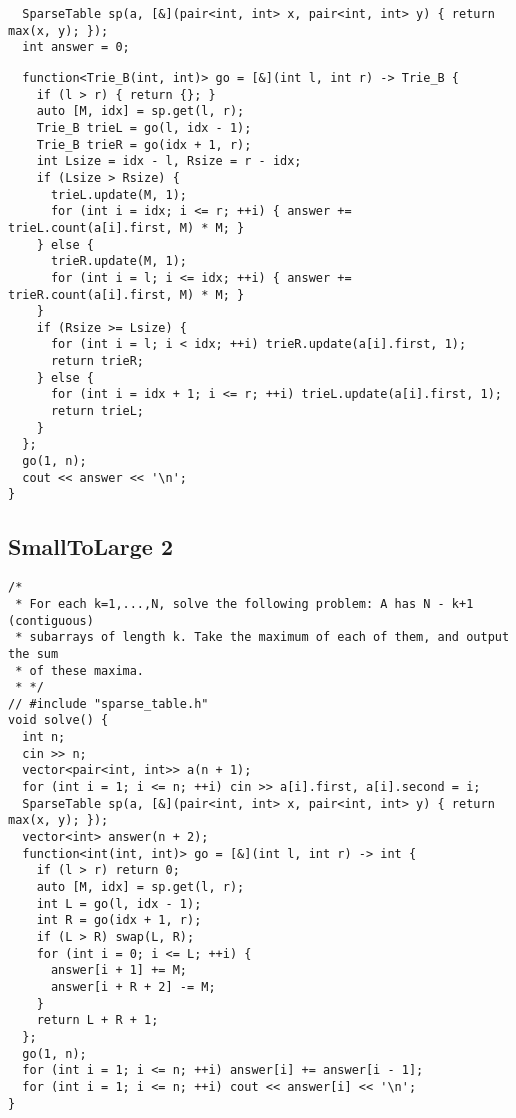 \documentclass[twoside]{article}
\begin{document}
\begin{multicols*}{2}
\begin{verbatim}
  SparseTable sp(a, [&](pair<int, int> x, pair<int, int> y) { return max(x, y); });
  int answer = 0;
\end{verbatim}
\vspace{-12pt}
\begin{verbatim}
  function<Trie_B(int, int)> go = [&](int l, int r) -> Trie_B {
    if (l > r) { return {}; }
    auto [M, idx] = sp.get(l, r);
    Trie_B trieL = go(l, idx - 1);
    Trie_B trieR = go(idx + 1, r);
    int Lsize = idx - l, Rsize = r - idx;
    if (Lsize > Rsize) {
      trieL.update(M, 1);
      for (int i = idx; i <= r; ++i) { answer += trieL.count(a[i].first, M) * M; }
    } else {
      trieR.update(M, 1);
      for (int i = l; i <= idx; ++i) { answer += trieR.count(a[i].first, M) * M; }
    }
    if (Rsize >= Lsize) {
      for (int i = l; i < idx; ++i) trieR.update(a[i].first, 1);
      return trieR;
    } else {
      for (int i = idx + 1; i <= r; ++i) trieL.update(a[i].first, 1);
      return trieL;
    }
  };
  go(1, n);
  cout << answer << '\n';
}
\end{verbatim}

{
\subsection*{SmallToLarge 2}
}
\begin{verbatim}
/*
 * For each k=1,...,N, solve the following problem: A has N - k+1 (contiguous)
 * subarrays of length k. Take the maximum of each of them, and output the sum
 * of these maxima.
 * */
// #include "sparse_table.h"
void solve() {
  int n;
  cin >> n;
  vector<pair<int, int>> a(n + 1);
  for (int i = 1; i <= n; ++i) cin >> a[i].first, a[i].second = i;
  SparseTable sp(a, [&](pair<int, int> x, pair<int, int> y) { return max(x, y); });
  vector<int> answer(n + 2);
  function<int(int, int)> go = [&](int l, int r) -> int {
    if (l > r) return 0;
    auto [M, idx] = sp.get(l, r);
    int L = go(l, idx - 1);
    int R = go(idx + 1, r);
    if (L > R) swap(L, R);
    for (int i = 0; i <= L; ++i) {
      answer[i + 1] += M;
      answer[i + R + 2] -= M;
    }
    return L + R + 1;
  };
  go(1, n);
  for (int i = 1; i <= n; ++i) answer[i] += answer[i - 1];
  for (int i = 1; i <= n; ++i) cout << answer[i] << '\n';
}
\end{verbatim}


\end{multicols*}
\end{document}

